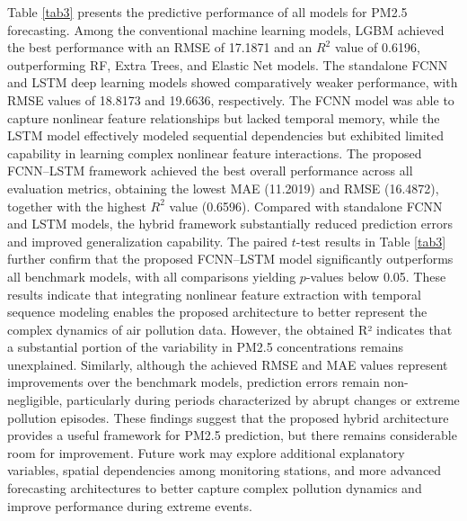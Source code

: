 \documentclass[twoside]{article}
\begin{document}

Table \ref{tab3} presents the predictive performance of all models for PM2.5 forecasting. Among the conventional machine learning models, LGBM achieved the best performance with an RMSE of 17.1871 and an $R^{2}$  value of 0.6196, outperforming RF, Extra Trees, and Elastic Net models. The standalone FCNN and LSTM deep learning models showed comparatively weaker performance, with RMSE values of 18.8173 and 19.6636, respectively. The FCNN model was able to capture nonlinear feature relationships but lacked temporal memory, while the LSTM model effectively modeled sequential dependencies but exhibited limited capability in learning complex nonlinear feature interactions. The proposed FCNN–LSTM framework achieved the best overall performance across all evaluation metrics, obtaining the lowest MAE (11.2019) and RMSE (16.4872), together with the highest $R^{2}$ value (0.6596). Compared with standalone FCNN and LSTM models, the hybrid framework substantially reduced prediction errors and improved generalization capability. The paired $t$-test results in Table \ref{tab3} further confirm that the proposed FCNN–LSTM model significantly outperforms all benchmark models, with all comparisons yielding $p$-values below 0.05. These results indicate that integrating nonlinear feature extraction with temporal sequence modeling enables the proposed architecture to better represent the complex dynamics of air pollution data. However, the obtained R² indicates that a substantial portion of the variability in PM2.5 concentrations remains unexplained. Similarly, although the achieved RMSE and MAE values represent improvements over the benchmark models, prediction errors remain non-negligible, particularly during periods characterized by abrupt changes or extreme pollution episodes. These findings suggest that the proposed hybrid architecture provides a useful framework for PM2.5 prediction, but there remains considerable room for improvement. Future work may explore additional explanatory variables, spatial dependencies among monitoring stations, and more advanced forecasting architectures to better capture complex pollution dynamics and improve performance during extreme events.
\end{document}
